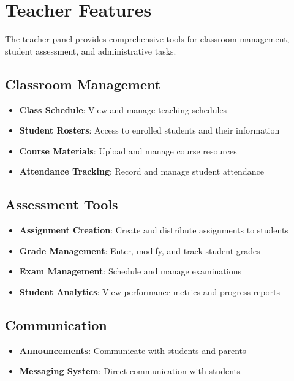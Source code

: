 \section{Teacher Features}

The teacher panel provides comprehensive tools for classroom management, student assessment, and administrative tasks.

\subsection{Classroom Management}

\begin{itemize}
    \item \textbf{Class Schedule}: View and manage teaching schedules
    \item \textbf{Student Rosters}: Access to enrolled students and their information
    \item \textbf{Course Materials}: Upload and manage course resources
    \item \textbf{Attendance Tracking}: Record and manage student attendance
\end{itemize}

\subsection{Assessment Tools}

\begin{itemize}
    \item \textbf{Assignment Creation}: Create and distribute assignments to students
    \item \textbf{Grade Management}: Enter, modify, and track student grades
    \item \textbf{Exam Management}: Schedule and manage examinations
    \item \textbf{Student Analytics}: View performance metrics and progress reports
\end{itemize}

\subsection{Communication}

\begin{itemize}
    \item \textbf{Announcements}: Communicate with students and parents
    \item \textbf{Messaging System}: Direct communication with students
\end{itemize}

